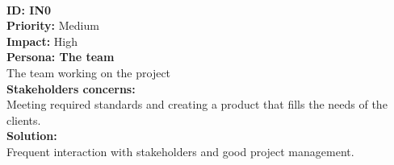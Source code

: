 \\
\textbf{ID: IN0}\\
\textbf{Priority:} Medium\\
\textbf{Impact:} High\\
\textbf{Persona: The team\\}
The team working on the project\\
\textbf{Stakeholders concerns:\\}
Meeting required standards and creating a product that fills the needs of the clients.\\
\textbf{Solution:\\}
Frequent interaction with stakeholders and good project management.\\
\\

